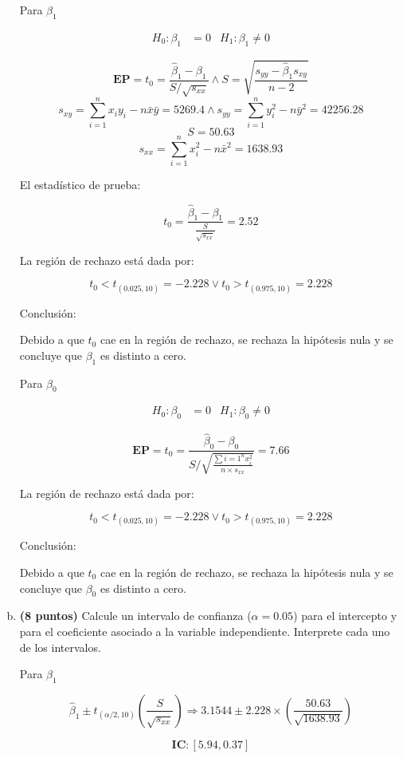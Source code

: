 \documentclass[../main.tex]{subfiles}
\begin{document}
\begin{enumerate}[(a)]
Para $\beta_1$

\begin{align*}
	H_0 : \beta_1 &= 0 & H_1 : \beta_1 \neq 0
\end{align*}

$$\textbf{EP} = t_0 = \frac{\hat{\beta}_1 - \beta_1}{S/\sqrt{s_{xx}}} \wedge S = \sqrt{\frac{s_{yy} - \hat{\beta}_1 s_{xy}}{n-2}}$$
$$s_{xy} = \sum_{i =1}^{n}x_iy_i-n\bar{x}\bar{y} = 5269.4 \wedge s_{yy} = \sum_{i = 1}^{n}y_i^2 - n \bar{y}^2 = 42256.28$$
$$S = 50.63$$
$$s_{xx} = \sum_{i=1}^{n}x_{i}^2 - n\bar{x}^2 = 1638.93$$

El estadístico de prueba:

$$t_0 = \frac{\hat{\beta}_1 - \beta_1}{\frac{S}{\sqrt{s_{xx}}}} = 2.52$$

La región de rechazo está dada por:

$$t_0 < t_{(0.025, 10)} = -2.228 \vee t_0 > t_{(0.975, 10)} = 2.228$$

Conclusión:

Debido a que $t_0$ cae en la región de rechazo, se rechaza la hipótesis nula y se concluye que $\beta_1$ es distinto a cero.

Para $\beta_0$

\begin{align*}
	H_0 : \beta_0 &= 0 & H_1 : \beta_0 \neq 0
\end{align*}

$$\textbf{EP} = t_0 = \frac{\hat{\beta}_0 - \beta_0}{S/\sqrt{\frac{\sum{i = 1}^{n}x_i^2}{n\times s_{xx}}}} = 7.66$$

La región de rechazo está dada por:

$$t_0 < t_{(0.025, 10)} = -2.228 \vee t_0 > t_{(0.975, 10)} = 2.228$$

Conclusión:

Debido a que $t_0$ cae en la región de rechazo, se rechaza la hipótesis nula y se concluye que $\beta_0$ es distinto a cero.

\item \textbf{(8 puntos)} Calcule un intervalo de confianza ($\alpha = 0.05$) para el intercepto y para el coeficiente asociado a la variable independiente. Interprete cada uno de los intervalos.

Para $\beta_1$

$$\hat{\beta}_1 \pm t_{(\alpha / 2, 10)}\left( \frac{S}{\sqrt{s_{xx}}}\right) \Rightarrow 3.1544 \pm 2.228 \times \left( \frac{50.63}{\sqrt{1638.93}}\right)$$

$$\textbf{IC} : \left[5.94, 0.37 \right]$$


\end{enumerate}
\end{document}
